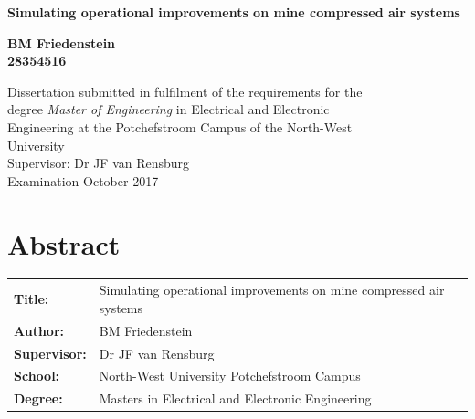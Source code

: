 \documentclass[12pt, english, oneside]{report}%
\begin{document}
\begin{titlepage}
	\BgThispage	
		\vspace{0cm}
		\begin{center}
			\textbf{\singlespacing\huge{Simulating operational improvements on mine compressed air systems}\\
			}\par
			\vspace{3cm}
			\LARGE{ \textbf{BM Friedenstein \\28354516} }
		\end{center}
	
	\vspace{2cm}
	
\begin{flushleft}
	{\singlespacing\centering \large Dissertation submitted in fulfilment of the requirements for the \\ degree {\color{MasterBlue} \textit{Master of Engineering}} in {\color{MasterBlue}Electrical and Electronic \\ Engineering} at the Potchefstroom Campus of the North-West\\ University\\
	}
	\vspace{2cm}
	{\large \setlength{\parindent}{0.5cm} Supervisor: Dr JF van Rensburg \\
	\vspace{1cm}
	\large{Examination October 2017}\\		
	}
\end{flushleft}
\end{titlepage}
\clearpage

{\tiny }\section*{Abstract}
	\thispagestyle{plain}
	\vspace{0.2cm}
	\begin{tabular}{p{2.35cm}p{13cm}}
		\textbf{Title:} & Simulating operational improvements on mine compressed air systems  \\
		\textbf{Author:} & BM Friedenstein \\
		\textbf{Supervisor:} & Dr JF van Rensburg \\
		\textbf{School:} & North-West University Potchefstroom Campus\\
		\textbf{Degree:} & Masters in Electrical and Electronic Engineering \\
	\end{tabular}
	\vspace{1cm}
\end{document}

